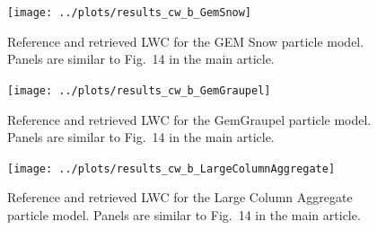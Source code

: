 \documentclass[journal abbreviation, manuscript]{copernicus}
\begin{document}
\begin{figure}[!hbpt]
\centering
\texttt{[image: ../plots/results\_cw\_b\_GemSnow]}
\caption{Reference and retrieved LWC for the GEM Snow particle model. Panels are similar to
Fig.~14 in the main article.}
\end{figure}
\clearpage

\begin{figure}[!hbpt]
\centering
\texttt{[image: ../plots/results\_cw\_b\_GemGraupel]}
\caption{Reference and retrieved LWC for the GemGraupel particle model. Panels are similar to
Fig.~14 in the main article.}
\end{figure}
\clearpage

\begin{figure}[!hbpt]
\centering
\texttt{[image: ../plots/results\_cw\_b\_LargeColumnAggregate]}
\caption{Reference and retrieved LWC for the Large Column Aggregate particle model. Panels are similar to
Fig.~14 in the main article.}
\end{figure}
\clearpage

\noappendix       %
\end{document}
